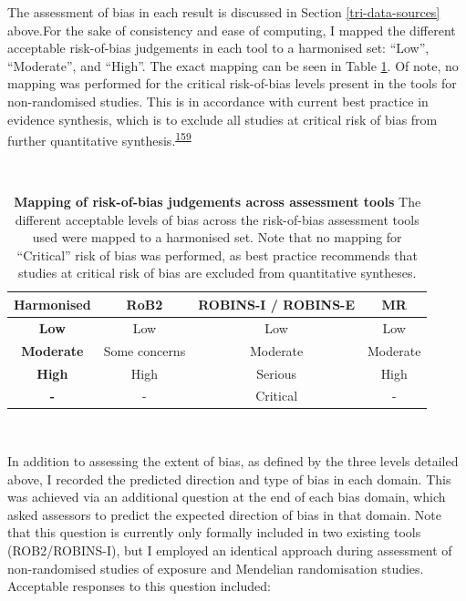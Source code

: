 \documentclass[a4paper, twoside]{templates/ociamthesis}
\begin{document}
The assessment of bias in each result is discussed in Section \ref{tri-data-sources} above.For the sake of consistency and ease of computing, I mapped the different acceptable risk-of-bias judgements in each tool to a harmonised set: ``Low'', ``Moderate'', and ``High''. The exact mapping can be seen in Table \ref{tab:robLevelsMapping-table}. Of note, no mapping was performed for the critical risk-of-bias levels present in the tools for non-randomised studies. This is in accordance with current best practice in evidence synthesis, which is to exclude all studies at critical risk of bias from further quantitative synthesis.\textsuperscript{\protect\hyperlink{ref-sterne2016}{159}}

~\\




\begin{table}[H]

\caption[Mapping of risk-of-bias judgements across assessment tools]{\label{tab:robLevelsMapping-table}\textbf{Mapping of risk-of-bias judgements across assessment tools} The different acceptable levels of bias across the risk-of-bias assessment tools used were mapped to a harmonised set. Note that no mapping for ``Critical'' risk of bias was performed, as best practice recommends that studies at critical risk of bias are excluded from quantitative syntheses.}
\centering
\begin{tabular}[t]{>{}cccc}
\toprule
\textbf{Harmonised} & \textbf{RoB2} & \textbf{ROBINS-I / ROBINS-E} & \textbf{MR}\\
\midrule
\textbf{Low} & Low & Low & Low\\
\midrule
\textbf{Moderate} & Some concerns & Moderate & Moderate\\
\midrule
\textbf{High} & High & Serious & High\\
\midrule
\textbf{-} & - & Critical & -\\
\bottomrule
\end{tabular}
\end{table}

~

In addition to assessing the extent of bias, as defined by the three levels detailed above, I recorded the predicted direction and type of bias in each domain. This was achieved via an additional question at the end of each bias domain, which asked assessors to predict the expected direction of bias in that domain. Note that this question is currently only formally included in two existing tools (ROB2/ROBINS-I), but I employed an identical approach during assessment of non-randomised studies of exposure and Mendelian randomisation studies. Acceptable responses to this question included:
\end{document}
